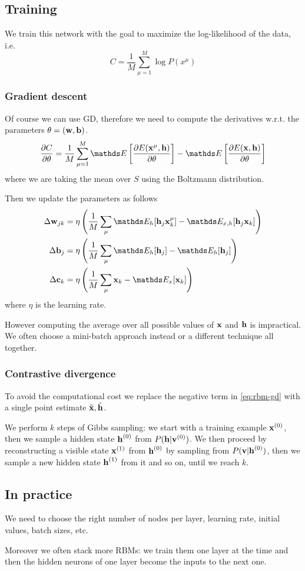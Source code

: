 \documentclass[12pt]{extarticle}
\renewcommand{\vec}[1]{\bvec{#1}}
\begin{document}
\subsection{Training}

We train this network with the goal to maximize the log-likelihood of the data, i.e.
\begin{equation}
	C = \frac{1}{M} \sum_{\mu = 1}^M \log P(x^\mu)
\end{equation}

\subsubsection{Gradient descent}

Of course we can use GD, therefore we need to compute the derivatives
w.r.t. the parameters $\theta = (\vec w, \vec b)$.
\begin{equation}
	\pdv{C}{\theta} = \frac{1}{M} \sum^M_{\mu = 1}
	\E\left[ \pdv{E(\vec x^\mu, \vec h)}{\theta} \right] - \E\left[ \pdv{E(\vec x, \vec h)}{\theta} \right]
	\label{eq:rbm-gd}
\end{equation}
where we are taking the mean over $S$ using the Boltzmann distribution.

Then we update the parameters as follows
\begin{align}
	\Delta \vec w_{jk} & = \eta
	\left( \frac{1}{M} \sum_{\mu}^{} \E_h[\vec h_j \vec x_k^\mu] - \E_{x, h}[\vec h_j \vec x_k] \right) \\
	\Delta \vec b_{j}  & = \eta
	\left( \frac{1}{M} \sum_{\mu}^{} \E_h[\vec h_j] - \E_{h}[\vec h_j] \right)                          \\
	\Delta \vec c_{k}  & = \eta
	\left( \frac{1}{M} \sum_{\mu}^{} \vec x_k - \E_{x}[\vec x_k] \right)
\end{align}
where $\eta$ is the learning rate.

However computing the average over all possible values of $\vec x$ and $\vec h$ is impractical.
We often choose a mini-batch approach instead or a different technique all together.

\subsubsection{Contrastive divergence}

To avoid the computational cost we replace the negative term in \cref{eq:rbm-gd} with a single point
estimate $\tilde {\vec x}, \tilde {\vec h}$.

We perform $k$ steps of Gibbs sampling: we start with a training example $\vec x^{(0)}$, then we
sample a hidden state $\vec{h}^{(0)}$ from \(P(\vec{h}|\vec{v}^{(0)})\). We then proceed by
reconstructing a visible state \(\vec{x}^{(1)}\) from \(\vec{h}^{(0)}\) by sampling from
\(P(\vec{v}|\vec{h}^{(0)})\), then we sample a new hidden state \(\vec{h}^{(1)}\) from it and so on,
until we reach $k$.

\subsection{In practice}

We need to choose the right number of nodes per layer, learning rate, initial values, batch sizes,
etc.

Moreover we often stack more RBMs: we train them one layer at the time and then the hidden neurons
of one layer become the inputs to the next one.
\end{document}
